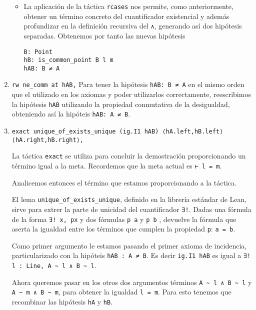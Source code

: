 \begin{enumerate}[label=L.\arabic*, topsep=0mm]
\begin{itemize}
		      \item La aplicación de la táctica \lstinline{rcases} nos permite, como
		            anteriormente, obtener un término concreto del cuantificador
		            existencial y además profundizar en la definición recursiva del
		            \lstinline{∧}, generando así dos hipótesis separadas. Obtenemos por
		            tanto las nuevas hipótesis
		            \begin{lstlisting}
B: Point 
hB: is_common_point B l m 
hAB: B ≠ A
\end{lstlisting}
	      \end{itemize}

	\item \lstinline{rw ne_comm at hAB,} Para tener la hipótesis
	      \lstinline{hAB: B ≠ A} en el mismo orden que el utilizado en los axiomas y
	      poder utilizarlos correctamente, reescribimos la hipótesis \lstinline{hAB}
	      utilizando la propiedad conmutativa de la desigualdad, obteniendo así la
	      hipóteis \lstinline{hAB: A ≠ B}.

	\item \lstinline{exact unique_of_exists_unique (ig.I1 hAB) ⟨hA.left,hB.left⟩ ⟨hA.right,hB.right⟩,}

	      La táctica \lstinline{exact} se utiliza para concluir la demostración
	      proporcionando un término igual a la meta. Recordemos que la meta actual
	      es \lstinline{⊢ l = m}.

	      Analicemos entonces el término que estamos proporcionando a la táctica.

	      El lema \lstinline{unique_of_exists_unique}, definido en la librería
	      estándar de Lean, sirve para extrer la parte de unicidad del cuantificador
	      \lstinline{∃!}. Dadas una fórmula de la forma \lstinline{∃! x, px} y dos
	      fórmulas \lstinline{p a} y \lstinline{p b} , devuelve la fórmula que
	      aserta la igualdad entre los términos que cumplen la propiedad
	      \lstinline{p}: \lstinline{a = b}.

	      Como primer argumento le estamos pasando el primer axioma de incidencia,
	      particularizado con la hipóteis \lstinline{hAB : A ≠ B}. Es decir
	      \lstinline{ig.I1 hAB} es igual a \lstinline{∃! l : Line, A ~ l ∧ B ~ l}.

	      Ahora queremos pasar en los otros dos argumentos términos
	      \lstinline{A ~ l ∧ B ~ l} y \lstinline{A ~ m ∧ B ~ m}, para obtener la
	      igualdad \lstinline{l = m}. Para esto tenemos que recombinar las hipótesis
	      \lstinline{hA} y \lstinline{hB}.


\end{enumerate}
